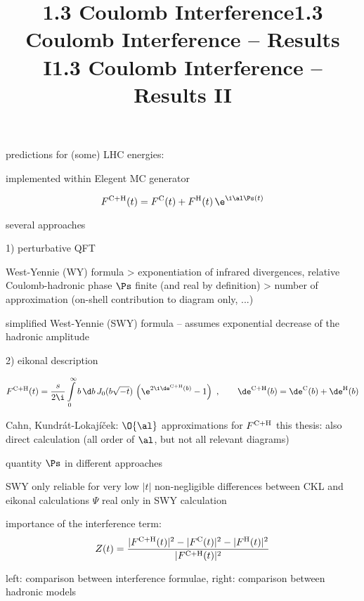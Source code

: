 \> predictions for (some) LHC energies:

\centerline{}

\> implemented within Elegent MC generator


\newpage%
\title{1.3 Coulomb Interference}

$$F^{\rm C+H}(t) = F^{\rm C}(t) + F^{\rm H}(t) \, \e^{\i \al \Ps(t)}$$

\> several approaches

1) perturbative QFT

\centerline{}

\> West-Yennie (WY) formula
\>> exponentiation of infrared divergences, relative Coulomb-hadronic phase $\Ps$ finite (and real by definition)
\>> number of approximation (on-shell contribution to diagram only, ...)

\> simplified West-Yennie (SWY) formula -- assumes exponential decrease of the hadronic amplitude


2) eikonal description

$$
	F^{\rm C+H}(t) = {s\over 2\i}\int\limits_0^\infty b\,\d b\,J_0(b\sqrt{-t})\,\left( \e^{2\i\de^{\rm C+H}(b)} - 1 \right)
	\ ,\qquad
	\de^{\rm C+H}(b) = \de^{\rm C}(b) + \de^{\rm H}(b)
$$

\> Cahn, Kundrát-Lokajíček: $\O{\al}$ approximations for $F^{\rm C+H}$
\> this thesis: also direct calculation (all order of $\al$, but not all relevant diagrams)

\newpage%
\title{1.3 Coulomb Interference -- Results I}

\> quantity $\Ps$ in different approaches

\centerline{}

\> SWY only reliable for very low $|t|$
\> non-negligible differences between CKL and eikonal calculations
\> $\Psi$ real only in SWY calculation

\newpage%
\title{1.3 Coulomb Interference -- Results II}

\> importance of the interference term:
$$Z(t) = {|F^{\rm C+H}(t)|^2 - |F^{\rm C}(t)|^2 - |F^{\rm H}(t)|^2\over |F^{\rm C+H}(t)|^2}$$

\> left: comparison between interference formulae, right: comparison between hadronic models

